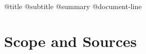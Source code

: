 

\newcommand{\CourseRoot}{curriculums/ecclesiastical-latin}
\newcommand{\CompanionID}{@{companion-id}}
\newcommand{\CompanionTitle}{@{companion-title}}
\renewcommand{\CoursePacing}{@{pacing}}



\CourseTitlePage
  {@{title}}
  {@{subtitle}}
  {@{summary}}
  {@{document-line}}

\begingroup
\sloppy
{}
\setlength{\parskip}{0pt}
\tableofcontents
\endgroup
\clearpage
{}


\clearpage
\part{Scope and Sources}


{\footnotesize
}


